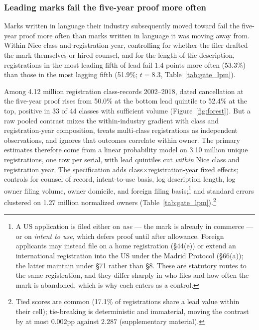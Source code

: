 \subsubsection{Leading marks fail the five-year proof more often}\label{sec:gate_headline}

Marks written in language their industry subsequently moved toward fail
the five-year proof more often than marks written in language it was
moving away from. Within Nice class and registration year, controlling for
whether the filer drafted the mark themselves or hired counsel, and for
the length of the description, registrations in the most leading fifth of
lead fail $1.4$ points more often (53.3\%) than those in the most lagging
fifth (51.9\%; $t = 8.3$, Table~\ref{tab:gate_lpm}).

Among 4.12 million registration class-records 2002--2018, dated
cancellation at the five-year proof rises from 50.0\% at the bottom
lead quintile to 52.4\% at the top, positive in 33 of 44 classes with
sufficient volume (Figure~\ref{fig:forest}). But a raw pooled contrast
mixes the within-industry gradient with class and registration-year
composition, treats multi-class registrations as independent observations,
and ignores that outcomes correlate within owner. The primary estimates
therefore come from a linear probability model on 3.10 million unique
registrations, one row per serial, with lead quintiles cut \emph{within}
Nice class and registration year. The specification adds
class$\times$registration-year fixed effects; controls for counsel of
record, intent-to-use basis, log description length, log owner filing
volume, owner domicile, and foreign filing basis;\footnote{A US
application is filed either on \emph{use} --- the mark is already in
commerce --- or on \emph{intent to use}, which defers proof until after
allowance. Foreign applicants may instead file on a home registration
(\S44(e)) or extend an international registration into the US under the
Madrid Protocol (\S66(a)); the latter maintain under \S71 rather than
\S8. These are statutory routes to the same registration, and they differ
sharply in who files and how often the mark is abandoned, which is why
each enters as a control.} and standard errors clustered on 1.27 million
normalized owners (Table~\ref{tab:gate_lpm}).\footnote{Tied scores are common (17.1\% of registrations share a lead
value within their cell); tie-breaking is deterministic and immaterial,
moving the contrast by at most $0.002$pp against $2.287$ (supplementary
material).}

